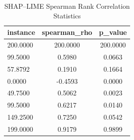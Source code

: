 \begin{table}
\centering
\caption{SHAP–LIME Spearman Rank Correlation Statistics}
\label{tab:agreement}
\begin{tabular}{lcc}
\toprule
instance & spearman_rho & p_value \\
\midrule
200.0000 & 200.0000 & 200.0000 \\
99.5000 & 0.5980 & 0.0663 \\
57.8792 & 0.1910 & 0.1664 \\
0.0000 & -0.4593 & 0.0000 \\
49.7500 & 0.5062 & 0.0023 \\
99.5000 & 0.6217 & 0.0140 \\
149.2500 & 0.7250 & 0.0542 \\
199.0000 & 0.9179 & 0.9899 \\
\bottomrule
\end{tabular}
\end{table}
